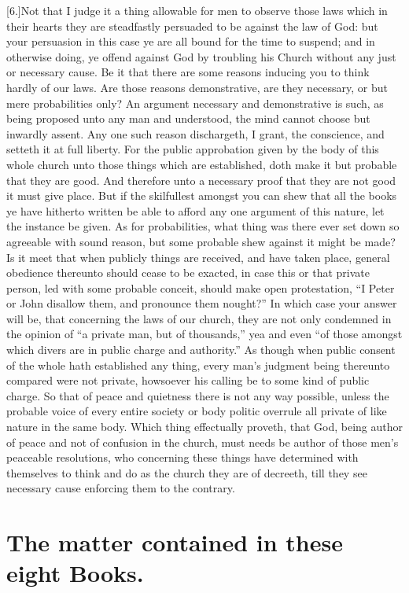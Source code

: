[6.]Not that I judge it a thing allowable for men to observe those laws which in their hearts they are steadfastly persuaded to be against the law of God: but your persuasion in this case ye are all bound for the time to suspend; and in otherwise doing, ye offend against God by troubling his Church without any just or necessary cause. Be it that there are some reasons inducing you to think hardly of our laws. Are those reasons demonstrative, are they necessary, or but mere probabilities only? An argument necessary and demonstrative is such, as being proposed unto any man and understood, the mind cannot choose but inwardly assent. Any one such reason dischargeth, I grant, the conscience, and setteth it at full liberty. For the public approbation given by the body of this whole church unto those things which are established, doth make it but probable that they are good. And therefore unto a necessary proof that they are not good it must give place. But if the skilfullest amongst you can shew that all the books ye have hitherto written be able to afford any one argument of this nature, let the instance be given. As for probabilities, what thing was there ever set down so agreeable with sound reason, but some probable shew against it might be made? Is it meet that when publicly things are received, and have taken place, general obedience thereunto should cease to be exacted, in case this or that private person, led with some probable conceit, should make open protestation, “I Peter or John disallow them, and pronounce them nought?” In which case your answer will be, that concerning the laws of our church, they are not only condemned in the opinion of “a private man, but of thousands,” yea and even “of those amongst which divers are in public charge and authority.” As though when public consent of the whole hath established any thing, every man’s judgment being thereunto compared were not private, howsoever his calling be to some kind of public charge. So that of peace and quietness there is not any way possible, unless the probable voice of every entire society or body politic overrule all private of like nature in the same body. Which thing effectually proveth, that God, being author of peace and not of confusion in the church, must needs be author of those men’s peaceable resolutions, who concerning these things have determined with themselves to think and do as the church they are of decreeth, till they see necessary cause enforcing them to the contrary.

\section*{The matter contained in these eight Books.}

